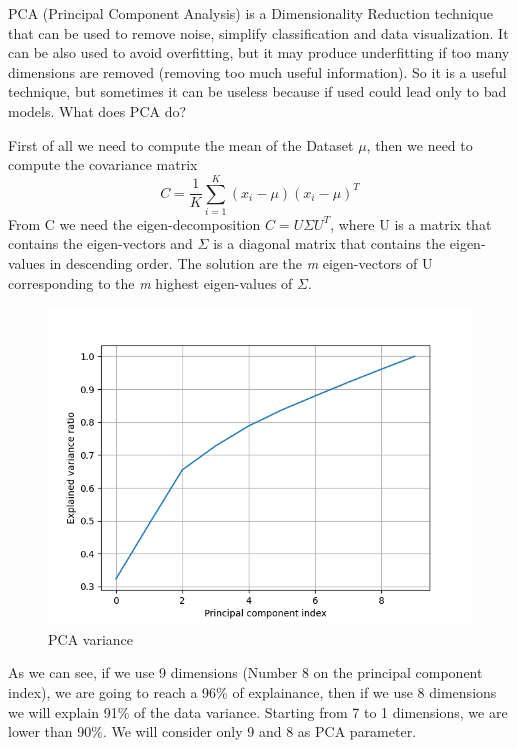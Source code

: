 \documentclass[english]{report}
\begin{document}
    PCA (Principal Component Analysis) is a Dimensionality Reduction technique that can be used to
    remove noise, simplify classification and data visualization.
    It can be also used to avoid overfitting, but it may produce underfitting if too many dimensions are removed
    (removing too much useful information).
    So it is a useful technique, but sometimes it can be useless because if used could
    lead only to bad models. \newline\newline
    What does PCA do? 

    First of all we need to compute the mean of the Dataset $\mu$, then we need to compute the covariance
    matrix
    \[C = \frac{1}{K} \sum_{i=1}^{K} (x_i-\mu)(x_i-\mu)^T \]
    From C we need the eigen-decomposition \(C = U \Sigma U^T \), where U is a matrix that
    contains the eigen-vectors and $\Sigma$ is a diagonal matrix that contains the eigen-values
    in descending order.
    The solution are the \textit{m} eigen-vectors of U corresponding to the \textit{m}
    highest eigen-values of $\Sigma$.

    \begin{figure}[H]
        \includegraphics[scale=0.5]{../../images/feature_plot/PCA_explainedVariance}
        \centering
        \caption{PCA variance}
        \label{fig:PCAvariance}
    \end{figure}

    As we can see, if we use 9 dimensions (Number 8 on the principal component index), we are going to
    reach a 96\% of explainance, then if we use 8 dimensions we will explain 91\% of the data variance.
    Starting from 7 to 1 dimensions, we are lower than 90\%. \newline
    We will consider only 9 and 8 as PCA parameter.
\end{document}
